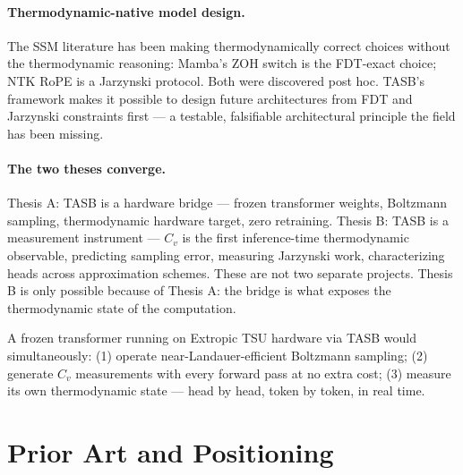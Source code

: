 \documentclass[11pt,a4paper]{article}
\begin{document}
\paragraph{Thermodynamic-native model design.}
The SSM literature has been making thermodynamically correct choices without the
thermodynamic reasoning: Mamba's ZOH switch is the FDT-exact choice; NTK RoPE
is a Jarzynski protocol. Both were discovered post hoc. TASB's framework makes
it possible to design future architectures from FDT and Jarzynski constraints
first --- a testable, falsifiable architectural principle the field has been missing.

\paragraph{The two theses converge.}
Thesis A: TASB is a hardware bridge --- frozen transformer weights, Boltzmann
sampling, thermodynamic hardware target, zero retraining. Thesis B: TASB is a
measurement instrument --- $C_v$ is the first inference-time thermodynamic
observable, predicting sampling error, measuring Jarzynski work, characterizing
heads across approximation schemes. These are not two separate projects. Thesis B
is only possible because of Thesis A: the bridge is what exposes the thermodynamic
state of the computation.

A frozen transformer running on Extropic TSU hardware via TASB would simultaneously:
(1) operate near-Landauer-efficient Boltzmann sampling;
(2) generate $C_v$ measurements with every forward pass at no extra cost;
(3) measure its own thermodynamic state --- head by head, token by token, in real time.

\section{Prior Art and Positioning}
\label{sec:prior}
\end{document}
